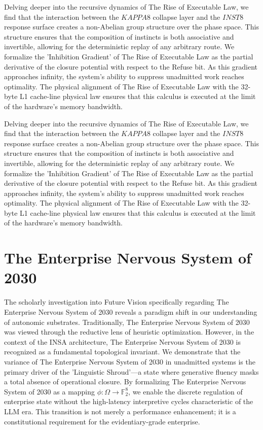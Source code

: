\documentclass[12pt,a4paper,oneside]{book}
\begin{document}
Delving deeper into the recursive dynamics of The Rise of Executable Law, we find that the interaction between the $KAPPA8$ collapse layer and the $INST8$ response surface creates a non-Abelian group structure over the phase space. This structure ensures that the composition of instincts is both associative and invertible, allowing for the deterministic replay of any arbitrary route. We formalize the 'Inhibition Gradient' of The Rise of Executable Law as the partial derivative of the closure potential with respect to the Refuse bit. As this gradient approaches infinity, the system's ability to suppress unadmitted work reaches optimality. The physical alignment of The Rise of Executable Law with the 32-byte L1 cache-line physical law ensures that this calculus is executed at the limit of the hardware's memory bandwidth. 

Delving deeper into the recursive dynamics of The Rise of Executable Law, we find that the interaction between the $KAPPA8$ collapse layer and the $INST8$ response surface creates a non-Abelian group structure over the phase space. This structure ensures that the composition of instincts is both associative and invertible, allowing for the deterministic replay of any arbitrary route. We formalize the 'Inhibition Gradient' of The Rise of Executable Law as the partial derivative of the closure potential with respect to the Refuse bit. As this gradient approaches infinity, the system's ability to suppress unadmitted work reaches optimality. The physical alignment of The Rise of Executable Law with the 32-byte L1 cache-line physical law ensures that this calculus is executed at the limit of the hardware's memory bandwidth. 

\section{The Enterprise Nervous System of 2030}
The scholarly investigation into Future Vision specifically regarding The Enterprise Nervous System of 2030 reveals a paradigm shift in our understanding of autonomic substrates. Traditionally, The Enterprise Nervous System of 2030 was viewed through the reductive lens of heuristic optimization. However, in the context of the INSA architecture, The Enterprise Nervous System of 2030 is recognized as a fundamental topological invariant. We demonstrate that the variance of The Enterprise Nervous System of 2030 in unadmitted systems is the primary driver of the 'Linguistic Shroud'---a state where generative fluency masks a total absence of operational closure. By formalizing The Enterprise Nervous System of 2030 as a mapping $\phi: \Omega \to \mathbb{F}_2^8$, we enable the discrete regulation of enterprise state without the high-latency interpretive cycles characteristic of the LLM era. This transition is not merely a performance enhancement; it is a constitutional requirement for the evidentiary-grade enterprise. 
\end{document}
